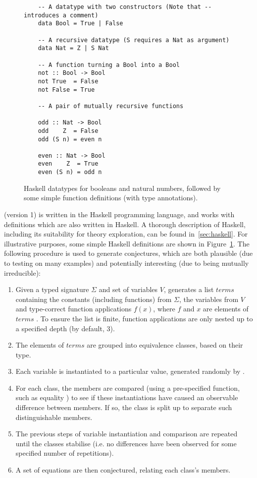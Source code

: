 \begin{figure}
  \centering
  \begin{verbatim}
    -- A datatype with two constructors (Note that -- introduces a comment)
    data Bool = True | False

    -- A recursive datatype (S requires a Nat as argument)
    data Nat = Z | S Nat

    -- A function turning a Bool into a Bool
    not :: Bool -> Bool
    not True  = False
    not False = True

    -- A pair of mutually recursive functions

    odd :: Nat -> Bool
    odd    Z  = False
    odd (S n) = even n

    even :: Nat -> Bool
    even    Z  = True
    even (S n) = odd n
  \end{verbatim}
  \caption{Haskell datatypes for booleans and natural numbers, followed by some
    simple function definitions (with type annotations).}
  \label{fig:haskellexample}
\end{figure}

\qspec{} (version 1) is written in the Haskell programming language, and works
with definitions which are also written in Haskell. A thorough description of
Haskell, including its suitability for theory exploration, can be found
in~\ref{sec:haskell}. For illustrative purposes, some simple Haskell definitions
are shown in Figure~\ref{fig:haskellexample}. The following procedure is used to
generate conjectures, which are both plausible (due to testing on many examples)
and potentially interesting (due to being mutually irreducible):

\begin{enumerate}
\item Given a typed signature $\Sigma$ and set of variables $V$, \qspec{}
  generates a list $terms$ containing the constants (including functions) from
  $\Sigma$, the variables from $V$ and type-correct function applications
  $f(x)$, where $f$ and $x$ are elements of $terms$ \iffalse TODO: A little
  awkward; maybe use the above notation? \fi. To ensure the list is finite,
  function applications are only nested up to a specified depth (by default, 3).
\item The elements of $terms$ are grouped into equivalence classes, based on
  their type.
\item Each variable is instantiated to a particular value, generated randomly by
  \qcheck{}.
\item For each class, the members are compared (using a pre-specified function,
  such as equality \hs{==}) to see if these instantiations have caused an
  observable difference between members. If so, the class is split up to
  separate such distinguishable members.
\item The previous steps of variable instantiation and comparison are repeated
  until the classes stabilise (i.e. no differences have been observed for some
  specified number of repetitions).
\item A set of equations are then conjectured, relating each class's members.
\end{enumerate}

